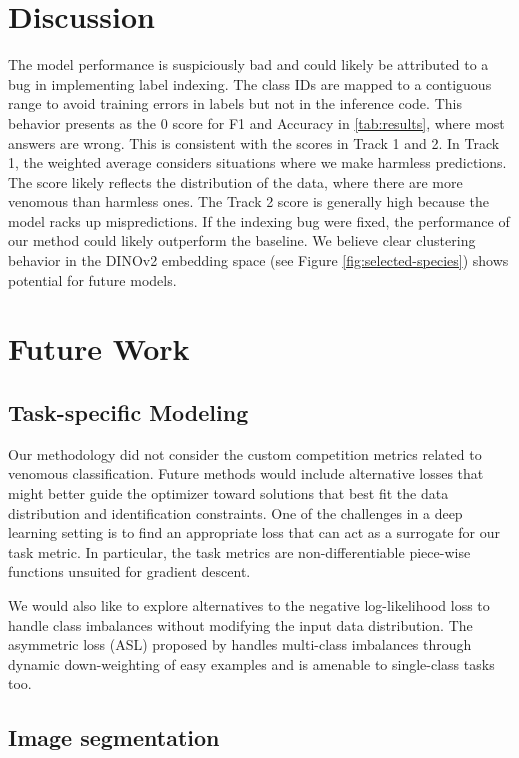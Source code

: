 \documentclass[]{ceurart}
\begin{document}
\section{Discussion}

The model performance is suspiciously bad and could likely be attributed to a bug in implementing label indexing. 
The class IDs are mapped to a contiguous range to avoid training errors in labels but not in the inference code.
This behavior presents as the 0 score for F1 and Accuracy in \ref{tab:results}, where most answers are wrong.
This is consistent with the scores in Track 1 and 2.
In Track 1, the weighted average considers situations where we make harmless predictions.
The score likely reflects the distribution of the data, where there are more venomous than harmless ones.
The Track 2 score is generally high because the model racks up mispredictions.
If the indexing bug were fixed, the performance of our method could likely outperform the baseline.
We believe clear clustering behavior in the DINOv2 embedding space (see Figure \ref{fig:selected-species}) shows potential for future models.

\section{Future Work}

\subsection{Task-specific Modeling}

Our methodology did not consider the custom competition metrics related to venomous classification.
Future methods would include alternative losses that might better guide the optimizer toward solutions that best fit the data distribution and identification constraints.
One of the challenges in a deep learning setting is to find an appropriate loss that can act as a surrogate for our task metric.
In particular, the task metrics are non-differentiable piece-wise functions unsuited for gradient descent.

We would also like to explore alternatives to the negative log-likelihood loss to handle class imbalances without modifying the input data distribution.
The asymmetric loss (ASL) proposed by \cite{ridnik2021asymmetric} handles multi-class imbalances through dynamic down-weighting of easy examples and is amenable to single-class tasks too.

\subsection{Image segmentation}
\end{document}
